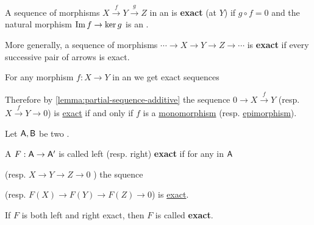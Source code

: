 \documentclass[../../main]{subfiles}
\begin{document}
\begin{definition} \label{def:exact-sequence}
  A sequence of morphisms \(X \xrightarrow{f} Y \xrightarrow{g} Z\) in an  is \textbf{exact} (at \(Y\)) if \(g \circ f = 0\) and the natural morphism \(\operatorname*{Im} f \to \ker g\) is an .

  More generally, a sequence of morphisms \(\cdots \to X \to Y \to Z \to \cdots\) is \textbf{exact} if every successive pair of arrows is exact.
\end{definition}

\begin{remark}
  For any morphism \(f: X \to Y\) in an  we get exact sequences
  \begin{center}
  \end{center}

  Therefore by \autoref{lemma:partial-sequence-additive} the sequence \(0 \to X \xrightarrow{f} Y\) (resp. \(X \xrightarrow{f} Y \to 0\)) is \hyperref[def:exact-sequence]{exact} if and only if \(f\) is a \hyperref[def:mono-epi-morphism]{monomorphism} (resp. \hyperref[def:mono-epi-morphism]{epimorphism}).
\end{remark}

\begin{definition} \label{def:exact-functor}
  Let \(\mathsf{A}, \mathsf{B}\) be two .

  A  \(F: \mathsf{A} \to \mathsf{A}'\) is called left (resp. right) \textbf{exact} if for any  in \(\mathsf{A}\)
  \begin{center}
  \end{center}
  (resp. \(X \to Y \to Z \to 0\) ) the squence
  \begin{center}
  \end{center}
  (resp. \(F(X) \to F(Y) \to F(Z) \to 0\)) is \hyperref[def:exact-sequence]{exact}.

  If \(F\) is both left and right exact, then \(F\) is called \textbf{exact}.
\end{definition}
\end{document}
